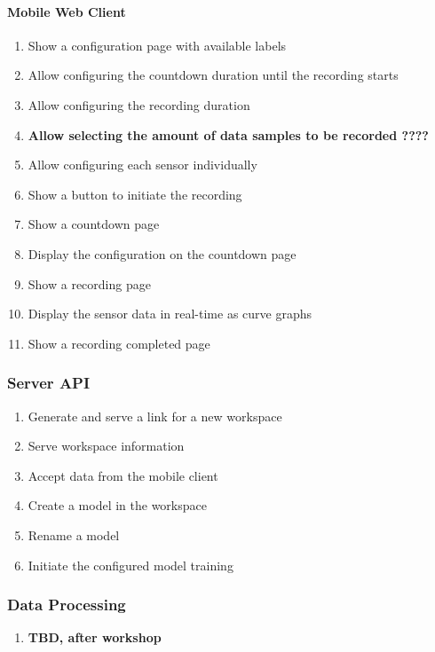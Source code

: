 \paragraph{Mobile Web Client}
\begin{enumerate}[resume*]
    \item Show a configuration page with available labels
    \item Allow configuring the countdown duration until the recording starts
    \item Allow configuring the recording duration
    \item \textbf{Allow selecting the amount of data samples to be recorded ????} %
    \item Allow configuring each sensor individually
    \item Show a button to initiate the recording
    \item Show a countdown page
    \item Display the configuration on the countdown page
    \item Show a recording page
    \item Display the sensor data in real-time as curve graphs
    \item Show a recording completed page %
\end{enumerate}

\subsubsection{Server API}
\begin{enumerate}[resume*]
    \item Generate and serve a link for a new workspace
    \item Serve workspace information
    \item Accept data from the mobile client
    \item Create a model in the workspace
    \item Rename a model
    \item Initiate the configured model training
\end{enumerate}

\subsubsection{Data Processing}
\begin{enumerate}[resume*]
    \item \textbf{TBD, after workshop}
\end{enumerate}

